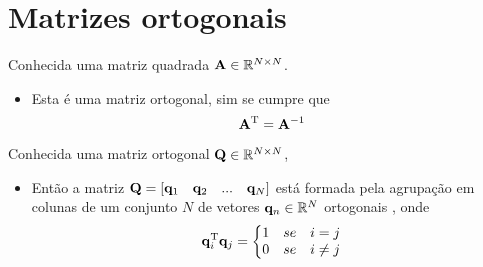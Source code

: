 \section{ Matrizes ortogonais}


\begin{definition}\label{def:ortogonalmatrix0}
Conhecida uma matriz quadrada $\MATRIX{A} \in \mathbb{R}^{N \times N}$. 
\begin{itemize}
\item Esta é uma matriz ortogonal, sim se cumpre que \cite[pp. 66]{golub2013matrix}
\begin{equation}
\MATRIX{A}^{\transpose} = \MATRIX{A}^{-1}
\end{equation}
\end{itemize}
\end{definition}

\begin{theorem}\label{theo:ortogonalmatrix0}
Conhecida uma matriz ortogonal $\MATRIX{Q} \in \mathbb{R}^{N \times N}$,
\begin{itemize}
\item Então a matriz $\MATRIX{Q}=\left[\VECTOR{q}_1\quad \VECTOR{q}_2\quad ... \quad \VECTOR{q}_N \right]$
está formada pela agrupação em colunas de um conjunto $N$ de vetores $\VECTOR{q}_n \in \mathbb{R}^{N}$
ortogonais \cite[pp. 66]{golub2013matrix}, onde 
\begin{equation}
\VECTOR{q}_i^{\transpose}\VECTOR{q}_j=
\left\{ 
\begin{matrix}
1 & se & i = j\\
0 & se & i \neq j
\end{matrix}
\right.
\end{equation} 
\end{itemize}
\end{theorem}

